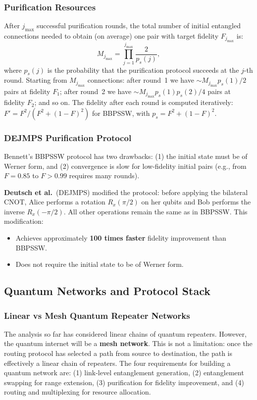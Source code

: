 \documentclass[10pt,a4paper]{article}
\begin{document}
\subsubsection*{Purification Resources}

After $j_{\max}$ successful purification rounds, the total number of initial entangled connections needed to obtain (on average) one pair with target fidelity $F_{j_{\max}}$ is:
\[
M_{j_{\max}}=\prod_{j=1}^{j_{\max}}\frac{2}{p_s(j)},
\]
where $p_s(j)$ is the probability that the purification protocol succeeds at the $j$-th round. Starting from $M_{j_{\max}}$ connections: after round~1 we have $\sim M_{j_{\max}}p_s(1)/2$ pairs at fidelity $F_1$; after round~2 we have $\sim M_{j_{\max}}p_s(1)p_s(2)/4$ pairs at fidelity $F_2$; and so on. The fidelity after each round is computed iteratively: $F'=F^2/(F^2+(1-F)^2)$ for BBPSSW, with $p_s=F^2+(1-F)^2$.

\subsubsection*{DEJMPS Purification Protocol}

Bennett's BBPSSW protocol has two drawbacks: (1) the initial state must be of Werner form, and (2) convergence is slow for low-fidelity initial pairs (e.g., from $F=0.85$ to $F>0.99$ requires many rounds).

\textbf{Deutsch et al.}\ (DEJMPS) modified the protocol: before applying the bilateral CNOT, Alice performs a rotation $R_x(\pi/2)$ on her qubits and Bob performs the inverse $R_x(-\pi/2)$. All other operations remain the same as in BBPSSW. This modification:
\begin{itemize}[nosep]
\item Achieves approximately \textbf{100 times faster} fidelity improvement than BBPSSW.
\item Does not require the initial state to be of Werner form.
\end{itemize}

\subsection{Quantum Networks and Protocol Stack}

\subsubsection*{Linear vs Mesh Quantum Repeater Networks}

The analysis so far has considered linear chains of quantum repeaters. However, the quantum internet will be a \textbf{mesh network}. This is not a limitation: once the routing protocol has selected a path from source to destination, the path is effectively a linear chain of repeaters. The four requirements for building a quantum network are: (1) link-level entanglement generation, (2) entanglement swapping for range extension, (3) purification for fidelity improvement, and (4) routing and multiplexing for resource allocation.
\end{document}
